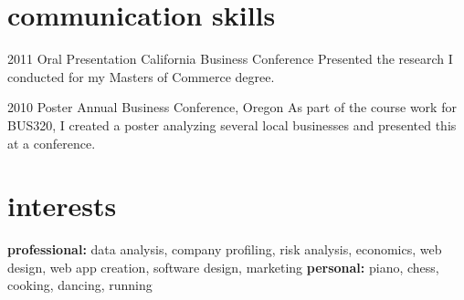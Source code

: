 \documentclass[]{friggeri-cv} %
\begin{document}

\section{communication skills}

\begin{entrylist}


\entry
{2011}
{Oral Presentation}
{California Business Conference}
{Presented the research I conducted for my Masters of Commerce degree.}


\entry
{2010}
{Poster}
{Annual Business Conference, Oregon}
{As part of the course work for BUS320, I created a poster analyzing several local businesses and presented this at a conference.}


\end{entrylist}


\section{interests}

\textbf{professional:} data analysis, company profiling, risk analysis, economics, web design, web app creation, software design, marketing \textbf{personal:} piano, chess, cooking, dancing, running
\end{document}
